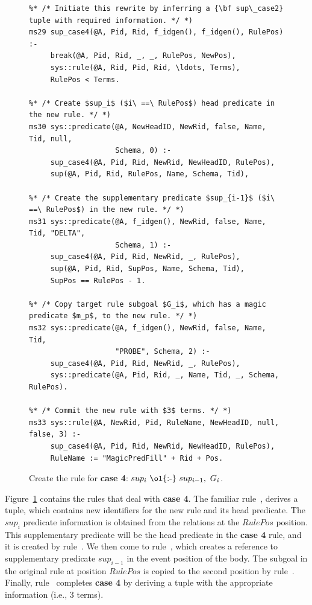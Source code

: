 \begin{figure}[!t]
\ssp
\centering
\begin{lstlisting}
%* /* Initiate this rewrite by inferring a {\bf sup\_case2} tuple with required information. */ *)
ms29 sup_case4(@A, Pid, Rid, f_idgen(), f_idgen(), RulePos) :-
     break(@A, Pid, Rid, _, _, RulePos, NewPos),
     sys::rule(@A, Rid, Pid, Rid, \ldots, Terms),
     RulePos < Terms.
	
%* /* Create $sup_i$ ($i\ ==\ RulePos$) head predicate in the new rule. */ *)
ms30 sys::predicate(@A, NewHeadID, NewRid, false, Name, Tid, null, 
                    Schema, 0) :-
     sup_case4(@A, Pid, Rid, NewRid, NewHeadID, RulePos),
     sup(@A, Pid, Rid, RulePos, Name, Schema, Tid),
	
%* /* Create the supplementary predicate $sup_{i-1}$ ($i\ ==\ RulePos$) in the new rule. */ *)
ms31 sys::predicate(@A, f_idgen(), NewRid, false, Name, Tid, "DELTA", 
                    Schema, 1) :-
     sup_case4(@A, Pid, Rid, NewRid, _, RulePos),
     sup(@A, Pid, Rid, SupPos, Name, Schema, Tid),
     SupPos == RulePos - 1.

%* /* Copy target rule subgoal $G_i$, which has a magic predicate $m_p$, to the new rule. */ *)
ms32 sys::predicate(@A, f_idgen(), NewRid, false, Name, Tid, 
                    "PROBE", Schema, 2) :-
     sup_case4(@A, Pid, Rid, NewRid, _, RulePos),
     sys::predicate(@A, Pid, Rid, _, Name, Tid, _, Schema, RulePos).
	
%* /* Commit the new rule with $3$ terms. */ *)
ms33 sys::rule(@A, NewRid, Pid, RuleName, NewHeadID, null, false, 3) :-
     sup_case4(@A, Pid, Rid, NewRid, NewHeadID, RulePos),
     RuleName := "MagicPredFill" + Rid + Pos.
\end{lstlisting}
\caption{\label{ch:magic:fig:rewrite7} 
Create the rule for {\bf case 4}: $sup_i\ \text{\ol{:-}}\ sup_{i-1},\ G_i$. } 
\end{figure}

Figure~\ref{ch:magic:fig:rewrite7} contains the rules that deal with {\bf case
4}.  The familiar rule~, derives a  tuple, which
contains new identifiers for the new rule and its head predicate.  The $sup_i$
predicate information is obtained from the  relations at the $RulePos$
position.  This supplementary predicate will be the head predicate in the {\bf
case 4} rule, and it is created by rule~.  We then come to
rule~, which creates a reference to supplementary predicate
$sup_{i-1}$ in the event position of the body.  The subgoal in the original
rule at position $RulePos$ is copied to the second position by rule~.
Finally, rule~ completes {\bf case 4} by deriving a  tuple
with the appropriate information (i.e., $3$ terms).


